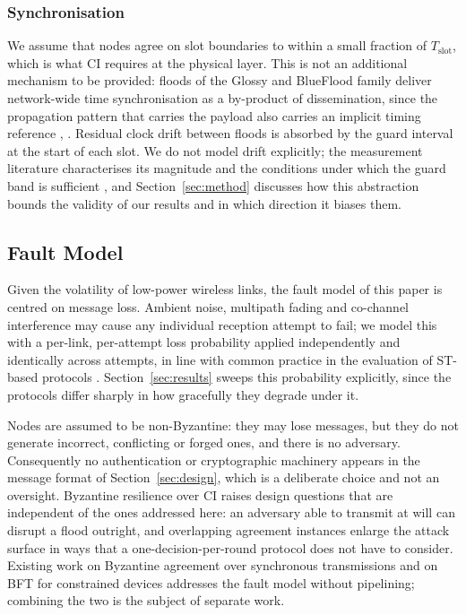 \documentclass[journal]{IEEEtran}
\newcommand{\CI}{CI}                      %
\newcommand{\Tslot}{T_{\mathrm{slot}}}    %
\begin{document}
\subsubsection{Synchronisation}
We assume that nodes agree on slot boundaries to within a small fraction
of $\Tslot$, which is what \CI{} requires at the physical layer. This is
not an additional mechanism to be provided: floods of the Glossy and
BlueFlood family deliver network-wide time synchronisation as a
by-product of dissemination, since the propagation pattern that carries
the payload also carries an implicit timing reference
\cite{ferrari11glossy}, \cite{alnahas21blueflood}. Residual clock drift
between floods is absorbed by the guard interval at the start of each
slot. We do not model drift explicitly; the measurement literature
characterises its magnitude and the conditions under which the guard band
is sufficient \cite{baddeley23understanding}, and
Section~\ref{sec:method} discusses how this abstraction bounds the
validity of our results and in which direction it biases them.

\subsection{Fault Model}
\label{sec:model-fault}

Given the volatility of low-power wireless links, the fault model of this
paper is centred on message loss. Ambient noise, multipath fading and
co-channel interference may cause any individual reception attempt to
fail; we model this with a per-link, per-attempt loss probability applied
independently and identically across attempts, in line with common
practice in the evaluation of ST-based protocols \cite{alnahas17a2}.
Section~\ref{sec:results} sweeps this probability explicitly, since the
protocols differ sharply in how gracefully they degrade under it.

Nodes are assumed to be non-Byzantine: they may lose messages, but they do
not generate incorrect, conflicting or forged ones, and there is no
adversary. Consequently no authentication or cryptographic machinery
appears in the message format of Section~\ref{sec:design}, which is a
deliberate choice and not an oversight. Byzantine resilience over \CI{}
raises design questions that are independent of the ones addressed here:
an adversary able to transmit at will can disrupt a flood outright, and
overlapping agreement instances enlarge the attack surface in ways that a
one-decision-per-round protocol does not have to consider. Existing work
on Byzantine agreement over synchronous transmissions
\cite{goyal22reli} and on BFT for constrained devices
\cite{boehm24tinybft} addresses the fault model without pipelining;
combining the two is the subject of separate work.
\end{document}
